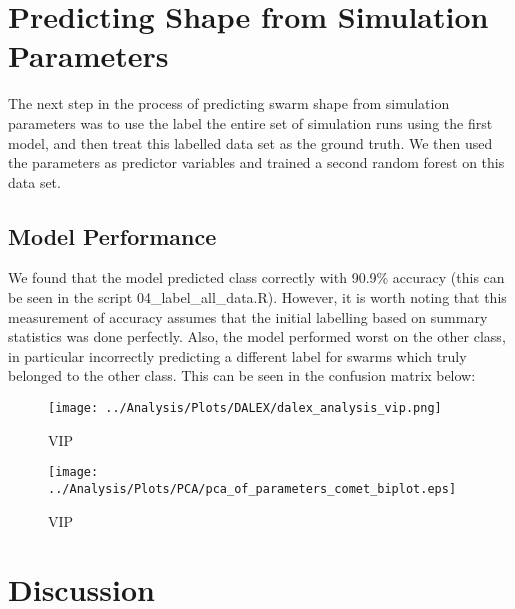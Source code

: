 \documentclass[a4paper]{article}
\begin{document}
\section{Predicting Shape from Simulation Parameters}

The next step in the process of predicting swarm shape from simulation parameters was to use the label the entire set of simulation runs using the first model, and then treat this labelled data set as the ground truth. We then used the parameters as predictor variables and trained a second random forest on this data set.

\subsection{Model Performance}

We found that the model predicted class correctly with 90.9\% accuracy (this can be seen in the script 04\_label\_all\_data.R). However, it is worth noting that this measurement of accuracy assumes that the initial labelling based on summary statistics was done perfectly. Also, the model performed worst on the other class, in particular incorrectly predicting a different label for swarms which truly belonged to the other class. This can be seen in the confusion matrix below:

{\color{red}{INSERT CONFUSION MATRIX}}

{\color{red}{include variable importance}}

\begin{figure}[]
	\centering
	\texttt{[image: ../Analysis/Plots/DALEX/dalex\_analysis\_vip.png]}
	\caption{VIP}
	\label{fig:vip}
\end{figure}

{\color{red}{Include some plots of fa against jumpD at different fixed values of other parameters.}}

{\color{red}{Include PCA biplots}}

\begin{figure}[]
	\centering
	\texttt{[image: ../Analysis/Plots/PCA/pca\_of\_parameters\_comet\_biplot.eps]}
	\caption{VIP}
	\label{fig:biplot}
\end{figure}



\section{Discussion}
\end{document}

